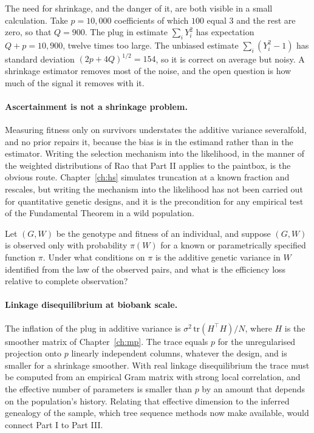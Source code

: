 The need for shrinkage, and the danger of it, are both visible in a small calculation. Take
$p=10{,}000$ coefficients of which $100$ equal $3$ and the rest are zero, so that $Q=900$. The plug
in estimate $\sum_iY_i^2$ has expectation $Q+p=10{,}900$, twelve times too large. The unbiased
estimate $\sum_i(Y_i^2-1)$ has standard deviation $(2p+4Q)^{1/2}=154$, so it is correct on average
but noisy. A shrinkage estimator removes most of the noise, and the open question is how much of
the signal it removes with it.

\paragraph{Ascertainment is not a shrinkage problem.} Measuring fitness only on survivors
understates the additive variance severalfold, and no prior repairs it, because the bias is in the
estimand rather than in the estimator. Writing the selection mechanism into the likelihood,
in the manner of the weighted distributions of Rao that Part II applies to the paintbox, is the
obvious route. Chapter~\ref{ch:hs} simulates truncation at a known fraction and rescales, but writing the mechanism into the likelihood has not been carried out for quantitative genetic designs, and it is the
precondition for any empirical test of the Fundamental Theorem in a wild population.

\begin{question}\label{future:q:ascert}
Let $(G,W)$ be the genotype and fitness of an individual, and suppose $(G,W)$ is observed only
with probability $\pi(W)$ for a known or parametrically specified function $\pi$. Under what
conditions on $\pi$ is the additive genetic variance in $W$ identified from the law of the
observed pairs, and what is the efficiency loss relative to complete observation?
\end{question}

\paragraph{Linkage disequilibrium at biobank scale.} The inflation of the plug in additive variance
is $\sigma^2\,\mathrm{tr}(H^\top H)/N$, where $H$ is the smoother matrix of Chapter~\ref{ch:mp}. The trace equals $p$ for the unregularised projection onto $p$ linearly independent columns, whatever the design, and is smaller for a shrinkage smoother.
With real linkage disequilibrium the trace must be computed from an empirical Gram matrix with
strong local correlation, and the effective number of parameters is smaller than $p$ by an amount
that depends on the population's history. Relating that effective dimension to the inferred
genealogy of the sample, which tree sequence methods now make available, would connect Part I to
Part III.

